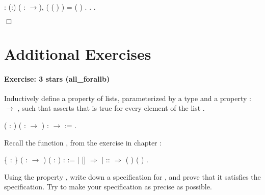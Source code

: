 \documentclass[12pt]{report}
\begin{document}
\begin{coqdoccode}
\coqdocnoindent
{}  : \coqdockw{\ensuremath{\forall}} (:)     ( : \ensuremath{\rightarrow}),\coqdoceol
\coqdocindent{1.00em}
( (   )  )  = (   ) .\coqdoceol
\coqdocnoindent
{}.\coqdoceol
 .\coqdoceol
\end{coqdoccode}
\ensuremath{\Box} \begin{coqdoccode}
\coqdocemptyline
\end{coqdoccode}
\section{Additional Exercises}



\paragraph{Exercise: 3 stars (all\_forallb)}

 Inductively define a property  of lists, parameterized by a
    type  and a property  :  \ensuremath{\rightarrow} , such that    
    asserts that  is true for every element of the list . \begin{coqdoccode}
\coqdocemptyline
\coqdocnoindent
{}  ( : ) ( :  \ensuremath{\rightarrow} ) :   \ensuremath{\rightarrow}  :=\coqdoceol
\coqdocindent{1.00em}
\coqdoceol
\coqdocnoindent
.\coqdoceol
\coqdocemptyline
\end{coqdoccode}
Recall the function , from the exercise
     in chapter : \begin{coqdoccode}
\coqdocemptyline
\coqdocnoindent
{}  \{ : \} ( :  \ensuremath{\rightarrow} ) ( :  ) :  :=\coqdoceol
\coqdocindent{1.00em}
  \coqdoceol
\coqdocindent{2.00em}
\ensuremath{|} [] \ensuremath{\Rightarrow} \coqdoceol
\coqdocindent{2.00em}
\ensuremath{|}  ::  \ensuremath{\Rightarrow}  ( ) (  )\coqdoceol
\coqdocindent{1.00em}
.\coqdoceol
\coqdocemptyline
\end{coqdoccode}
Using the property , write down a specification for ,
    and prove that it satisfies the specification. Try to make your 
    specification as precise as possible.
\end{document}
